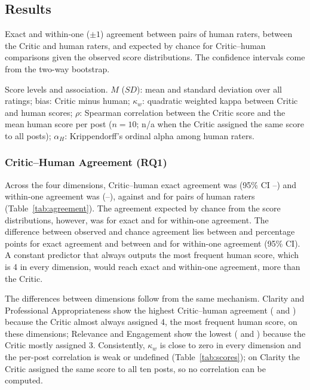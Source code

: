 \documentclass[a4paper,twoside]{article}
\begin{document}
\subsection{Results}

\begin{table}[t]
\centering
\caption{Exact and within-one ($\pm1$) agreement between pairs of human raters, between the Critic and human raters, and expected by chance for Critic--human comparisons given the observed score distributions. The confidence intervals come from the two-way bootstrap.}
\label{tab:agreement}
\small

\end{table}

\begin{table}[t]
\centering
\caption{Score levels and association. $M$ ($SD$): mean and standard deviation over all ratings; bias: Critic minus human; $\kappa_w$: quadratic weighted kappa between Critic and human scores; $\rho$: Spearman correlation between the Critic score and the mean human score per post ($n=10$; n/a when the Critic assigned the same score to all posts); $\alpha_H$: Krippendorff's ordinal alpha among human raters.}
\label{tab:scores}
\small
\begin{adjustbox}{max width=\textwidth}

\end{adjustbox}
\end{table}

\subsubsection{Critic--Human Agreement (RQ1)}

Across the four dimensions, Critic--human exact agreement was \CHexAll{} (95\% CI \CHexLo{}--\CHexHi{}) and within-one agreement was \CHwAll{} (\CHwLo{}--\CHwHi{}), against \HHexAll{} and \HHwAll{} for pairs of human raters (Table~\ref{tab:agreement}). The agreement expected by chance from the score distributions, however, was \CHchanceExAll{} for exact and \CHchanceWAll{} for within-one agreement. The difference between observed and chance agreement lies between \ChanceDiffExLo{} and \ChanceDiffExHi{} percentage points for exact agreement and between \ChanceDiffWLo{} and \ChanceDiffWHi{} for within-one agreement (95\% CI). A constant predictor that always outputs the most frequent human score, which is 4 in every dimension, would reach \ConstExAll{} exact and \ConstWAll{} within-one agreement, more than the Critic.

The differences between dimensions follow from the same mechanism. Clarity and Professional Appropriateness show the highest Critic--human agreement (\CHexCla{} and \CHexPro{}) because the Critic almost always assigned 4, the most frequent human score, on these dimensions; Relevance and Engagement show the lowest (\CHexRel{} and \CHexEng{}) because the Critic mostly assigned 3. Consistently, $\kappa_w$ is close to zero in every dimension and the per-post correlation is weak or undefined (Table~\ref{tab:scores}); on Clarity the Critic assigned the same score to all ten posts, so no correlation can be computed.
\end{document}

